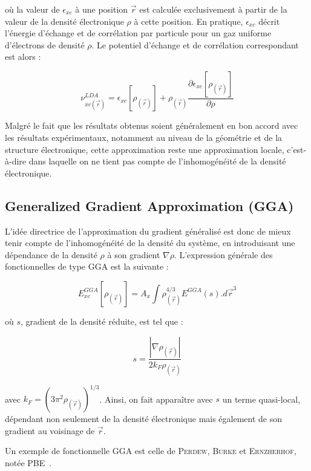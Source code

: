 \noindent où la valeur de $\epsilon_{xc}$ à une position $\vec{r}$ est calculée exclusivement à partir de la valeur de la densité électronique $\rho$ à cette position. En pratique, $\epsilon_{xc}$ décrit l’énergie d’échange et de corrélation par particule pour un gaz uniforme d’électrons de densité $\rho$. Le potentiel d’échange et de corrélation correspondant est alors :

\begin{equation}
\nu_{xc(\vec{r})}^{LDA} = \epsilon_{xc}[\rho_{(\vec{r})}] + \rho_{(\vec{r})} \frac{\partial \epsilon_{xc}[\rho_{(\vec{r})}]}{\partial \rho}
\end{equation}

Malgré le fait que les résultats obtenus soient généralement en bon accord avec les résultats expérimentaux, notamment au niveau de la géométrie et de la structure électronique, cette approximation reste une approximation locale, c'est-à-dire dans laquelle on ne tient pas compte de l’inhomogénéité de la densité électronique.

\subsection{Generalized Gradient Approximation (GGA)}

L’idée directrice de l’approximation du gradient généralisé est donc de mieux tenir compte de l’inhomogénéité de la densité du système, en introduisant une dépendance de la densité $\rho$ à son gradient $\nabla \rho$. L’expression générale des fonctionnelles de type GGA est la
suivante :

\begin{equation}
E_{xc}^{GGA}[\rho_{(\vec{r})}] = A_{x} \int \rho_{(\vec{r})}^{4/3} E^{GGA}(s) .d\vec{r}^{3}
\end{equation}

\noindent où $s$, gradient de la densité réduite, est tel que :

\begin{equation}
s = \frac{|\nabla \rho_{(\vec{r})}|}{2 k_{F} \rho_{(\vec{r})}}
\end{equation}

\noindent avec $k_{F} = (3 \pi^{2} \rho_{(\vec{r})})^{1/3}$. Ainsi, on fait apparaître avec $s$ un terme quasi-local, dépendant non seulement de la densité électronique mais également de son gradient au voisinage de $\vec{r}$.

Un exemple de fonctionnelle GGA est celle de \textsc{Perdew}, \textsc{Burke} et \textsc{Ernzherhof}, notée PBE~\cite{pbe}.

